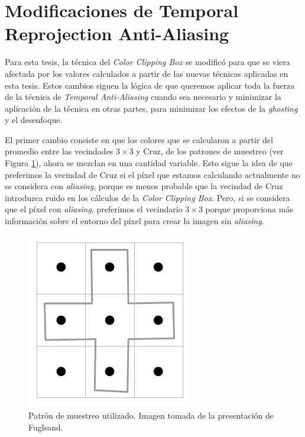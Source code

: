 \documentclass[pregrado]{tesis-usb} %
\begin{document}
\section[Modificaciones de Temporal Reprojection Anti-Aliasing ]{Modificaciones de Temporal Reprojection Anti-Aliasing }
Para esta tesis, la técnica del \textit{Color Clipping Box} se modificó para que se viera afectada por los valores calculados a partir de las nuevas técnicas aplicadas en esta tesis. Estos cambios siguen la lógica de que queremos aplicar toda la fuerza de la técnica de \textit{Temporal Anti-Aliasing} cuando sea necesario y minimizar la aplicación de la técnica en otras partes, para minimizar los efectos de la \textit{ghosting} y el desenfoque.

El primer cambio consiste en que los colores que se calcularon a partir del promedio entre las vecindades $3\times 3$ y Cruz, de los patrones de muestreo (ver Figura \ref{fig:samplingpattern_2}), ahora se mezclan en una cantidad variable. Esto sigue la idea de que preferimos la vecindad de Cruz si el píxel que estamos calculando actualmente no se considera con \textit{aliasing}, porque es menos probable que la vecindad de Cruz introduzca ruido en los cálculos de la \textit{Color Clipping Box}. Pero, si se considera que el píxel con \textit{aliasing}, preferimos el vecindario $3\times 3$ porque proporciona más información sobre el entorno del píxel para crear la imagen sin \textit{aliasing}. 

\begin{figure}[!hbt]
	\centering
	\includegraphics[scale=0.3]{images/sampling_pattern.png}
	\caption{Patrón de muestreo utilizado. Imagen tomada de la presentación de Fuglsand. \protect\cite{Fuglsand2016}}\label{fig:samplingpattern_2}
\end{figure}
\end{document}
